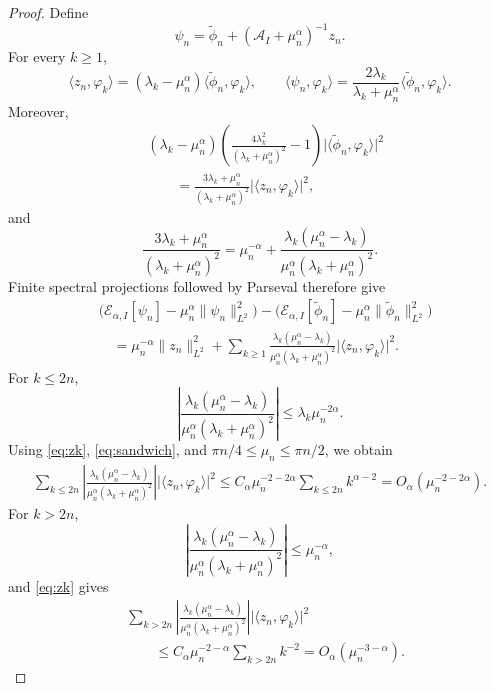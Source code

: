 \documentclass[11pt]{amsart}
\numberwithin{equation}{section}
\theoremstyle{remark}
\newcommand{\wt}{\widetilde}
\newcommand{\norm}[2][]{\lVert #2\rVert_{#1}}
\newcommand{\abs}[1]{\lvert #1\rvert}
\newcommand{\ip}[2]{\langle #1,#2\rangle}
\newcommand{\calE}{\mathcal E}
\begin{document}
\begin{proof}
Define
\begin{equation}\label{eq:filter-vector}
 \psi_n=\wt\phi_n+(\mathcal A_I+\mu_n^\alpha)^{-1}z_n.
\end{equation}
For every $k\ge1$,
\[
 \ip{z_n}{\varphi_k}
 =(\lambda_k-\mu_n^\alpha)\ip{\wt\phi_n}{\varphi_k},
 \qquad
 \ip{\psi_n}{\varphi_k}
 =\frac{2\lambda_k}{\lambda_k+\mu_n^\alpha}
 \ip{\wt\phi_n}{\varphi_k}.
\]
Moreover,
\[
 \begin{aligned}
 &(\lambda_k-\mu_n^\alpha)
 \left(\frac{4\lambda_k^2}{(\lambda_k+\mu_n^\alpha)^2}-1\right)
 \abs{\ip{\wt\phi_n}{\varphi_k}}^2\\
 &\qquad=\frac{3\lambda_k+\mu_n^\alpha}
 {(\lambda_k+\mu_n^\alpha)^2}\abs{\ip{z_n}{\varphi_k}}^2,
 \end{aligned}
\]
and
\[
 \frac{3\lambda_k+\mu_n^\alpha}{(\lambda_k+\mu_n^\alpha)^2}
 =\mu_n^{-\alpha}
 +\frac{\lambda_k(\mu_n^\alpha-\lambda_k)}
 {\mu_n^\alpha(\lambda_k+\mu_n^\alpha)^2}.
\]
Finite spectral projections followed by Parseval therefore give
\[
 \begin{aligned}
 &\bigl(\calE_{\alpha,I}[\psi_n]
 -\mu_n^\alpha\norm[L^2]{\psi_n}^2\bigr)
 -\bigl(\calE_{\alpha,I}[\wt\phi_n]
 -\mu_n^\alpha\norm[L^2]{\wt\phi_n}^2\bigr)\\
 &\quad=\mu_n^{-\alpha}\norm[L^2]{z_n}^2
 +\sum_{k\ge1}
 \frac{\lambda_k(\mu_n^\alpha-\lambda_k)}
 {\mu_n^\alpha(\lambda_k+\mu_n^\alpha)^2}
 \abs{\ip{z_n}{\varphi_k}}^2.
 \end{aligned}
\]
For $k\le2n$,
\[
 \left|\frac{\lambda_k(\mu_n^\alpha-\lambda_k)}
 {\mu_n^\alpha(\lambda_k+\mu_n^\alpha)^2}\right|
 \le\lambda_k\mu_n^{-2\alpha}.
\]
Using \eqref{eq:zk}, \eqref{eq:sandwich}, and
$\pi n/4\le\mu_n\le\pi n/2$, we obtain
\[
 \begin{aligned}
 \sum_{k\le2n}
 \left|\frac{\lambda_k(\mu_n^\alpha-\lambda_k)}
 {\mu_n^\alpha(\lambda_k+\mu_n^\alpha)^2}\right|
 \abs{\ip{z_n}{\varphi_k}}^2\le C_\alpha\mu_n^{-2-2\alpha}
 \sum_{k\le2n}k^{\alpha-2}
 =O_\alpha(\mu_n^{-2-2\alpha}).
 \end{aligned}
\]
For $k>2n$,
\[
 \left|\frac{\lambda_k(\mu_n^\alpha-\lambda_k)}
 {\mu_n^\alpha(\lambda_k+\mu_n^\alpha)^2}\right|
 \le\mu_n^{-\alpha},
\]
and \eqref{eq:zk} gives
\[
 \begin{aligned}
 &\sum_{k>2n}
 \left|\frac{\lambda_k(\mu_n^\alpha-\lambda_k)}
 {\mu_n^\alpha(\lambda_k+\mu_n^\alpha)^2}\right|
 \abs{\ip{z_n}{\varphi_k}}^2\\
 &\qquad\le C_\alpha\mu_n^{-2-\alpha}
 \sum_{k>2n}k^{-2}
 =O_\alpha(\mu_n^{-3-\alpha}).
 \end{aligned}
\]
\end{proof}
\end{document}
